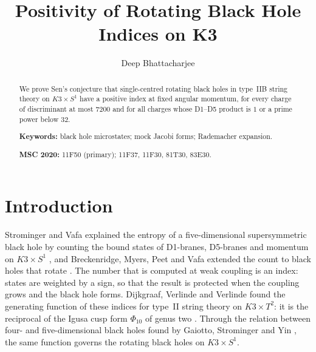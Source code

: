 \documentclass[11pt]{amsart}
\theoremstyle{definition}
\begin{document}
\title[Positivity of rotating black hole indices on K3]{Positivity of Rotating Black Hole\\ Indices on K3}

\author{Deep Bhattacharjee}
\address{Formerly, Electro-Gravitational Space Propulsion Laboratory (EGSPL), Bhubaneswar, Odisha 751030, India}
\address{Formerly, University of Calcutta (Heramba Chandra College), 23/49 Gariahat Road, Golpark, Kolkata 700029, West Bengal, India}

\begin{abstract}
We prove Sen's conjecture that single-centred rotating black holes in type~IIB string theory on $K3\times S^1$ have a positive index at fixed angular momentum, for every charge of discriminant at most $7200$ and for all charges whose D1--D5 product is $1$ or a prime power below $32$.

\medskip\noindent\textbf{Keywords:} black hole microstates; mock Jacobi forms; Rademacher expansion.

\smallskip\noindent\textbf{MSC 2020:} 11F50 (primary); 11F37, 11F30, 81T30, 83E30.
\end{abstract}

\maketitle

\section{Introduction}\label{sec:intro}

Strominger and Vafa explained the entropy of a five-dimensional supersymmetric black hole by counting the bound states of D1-branes, D5-branes and momentum on $K3\times S^1$ \cite{SV96}, and Breckenridge, Myers, Peet and Vafa extended the count to black holes that rotate \cite{BMPV97}. The number that is computed at weak coupling is an index: states are weighted by a sign, so that the result is protected when the coupling grows and the black hole forms. Dijkgraaf, Verlinde and Verlinde found the generating function of these indices for type~II string theory on $K3\times T^2$: it is the reciprocal of the Igusa cusp form $\Phi_{10}$ of genus two \cite{DVV97}. Through the relation between four- and five-dimensional black holes found by Gaiotto, Strominger and Yin \cite{GSY06}, the same function governs the rotating black holes on $K3\times S^1$.
\end{document}
